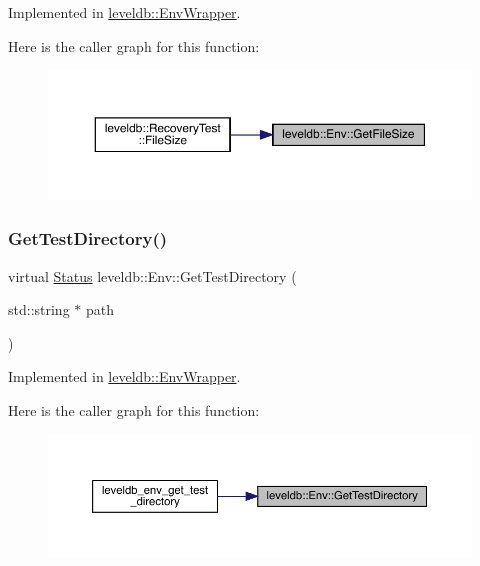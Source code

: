 Implemented in \mbox{\hyperlink{classleveldb_1_1_env_wrapper_a012b279556e2d53fb819b537722b3158}{leveldb\+::\+Env\+Wrapper}}.

Here is the caller graph for this function\+:
\nopagebreak
\begin{figure}[H]
\begin{center}
\leavevmode
\includegraphics[width=350pt]{classleveldb_1_1_env_aacb66541dcb3bd586e6cc5a87489690c_icgraph}
\end{center}
\end{figure}
\mbox{\label{classleveldb_1_1_env_ab57a55be37d4d57bf3c0ff83ee689f95}} 
\subsubsection{\texorpdfstring{GetTestDirectory()}{GetTestDirectory()}}
{\footnotesize\ttfamily virtual \mbox{\hyperlink{classleveldb_1_1_status}{Status}} leveldb\+::\+Env\+::\+Get\+Test\+Directory (\begin{DoxyParamCaption}\item[{std\+::string $\ast$}]{path }\end{DoxyParamCaption})\hspace{0.3cm}{\ttfamily [pure virtual]}}



Implemented in \mbox{\hyperlink{classleveldb_1_1_env_wrapper_aee69c4d48bec60d40126ef66ef451476}{leveldb\+::\+Env\+Wrapper}}.

Here is the caller graph for this function\+:
\nopagebreak
\begin{figure}[H]
\begin{center}
\leavevmode
\includegraphics[width=350pt]{classleveldb_1_1_env_ab57a55be37d4d57bf3c0ff83ee689f95_icgraph}
\end{center}
\end{figure}
\mbox{\label{classleveldb_1_1_env_a9b7266f0444f832e428328ff19b7b54c}} 
